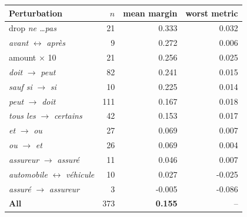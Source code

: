 \begin{tabular}{lrrr}
\toprule
Perturbation & $n$ & mean margin & worst metric \\
\midrule
drop \emph{ne \dots pas} & 21 & 0.333 & 0.032 \\
\emph{avant} $\leftrightarrow$ \emph{apr\`es} & 9 & 0.272 & 0.006 \\
amount $\times$ 10 & 21 & 0.256 & 0.025 \\
\emph{doit} $\rightarrow$ \emph{peut} & 82 & 0.241 & 0.015 \\
\emph{sauf si} $\rightarrow$ \emph{si} & 10 & 0.225 & 0.014 \\
\emph{peut} $\rightarrow$ \emph{doit} & 111 & 0.167 & 0.018 \\
\emph{tous les} $\rightarrow$ \emph{certains} & 42 & 0.153 & 0.017 \\
\emph{et} $\rightarrow$ \emph{ou} & 27 & 0.069 & 0.007 \\
\emph{ou} $\rightarrow$ \emph{et} & 26 & 0.069 & 0.004 \\
\emph{assureur} $\rightarrow$ \emph{assur\'e} & 11 & 0.046 & 0.007 \\
\emph{automobile} $\leftrightarrow$ \emph{v\'ehicule} & 10 & 0.027 & -0.025 \\
\emph{assur\'e} $\rightarrow$ \emph{assureur} & 3 & -0.005 & -0.086 \\
\midrule
\textbf{All} & 373 & \textbf{0.155} & -- \\
\bottomrule
\end{tabular}